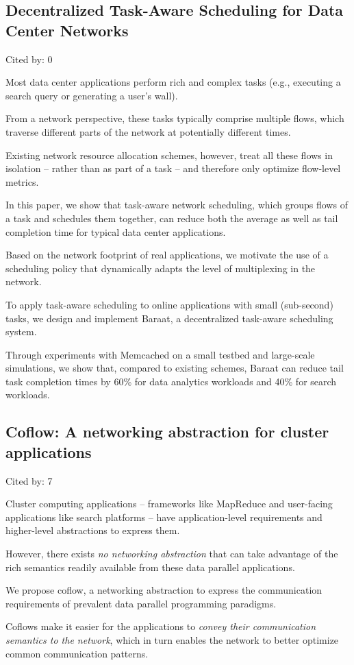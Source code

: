 \documentclass[a4paper,11pt]{article}
\begin{document}
\subsection*{Decentralized Task-Aware Scheduling for Data Center Networks}
{\color{cyan} {\color{magenta} Cited by: 0}

Most data center applications perform rich and complex tasks 
(e.g., executing a search query or generating a user's wall). 

From a network perspective, these tasks typically comprise multiple flows, which traverse different
parts of the network at potentially different times. 

Existing network resource allocation schemes, 
however, 
treat all these flows in isolation – rather than as part of a task – and therefore only optimize flow-level metrics.

In this paper, 
we show that task-aware network scheduling, which groups flows of a task and schedules them together, 
can reduce both the average as well as tail completion time for typical data center applications.

Based on the network footprint of real applications, 
we motivate the use of a scheduling policy that dynamically adapts the level of multiplexing in the network. 

To apply task-aware scheduling to online applications with small (sub-second) tasks, 
we design and implement 
{\color{black} Baraat\cite{baraat}}, 
a decentralized task-aware scheduling system. 

Through experiments with Memcached on a small testbed and large-scale simulations, 
we show that, 
compared to existing schemes, 
Baraat can reduce tail task completion times by 
60\% for data analytics workloads and 
40\% for search workloads.

}

\subsection*{Coflow: A networking abstraction for cluster applications}
{\color{cyan} {\color{magenta} Cited by: 7}

Cluster computing applications – 
frameworks like MapReduce and 
user-facing applications like search platforms –
have application-level requirements and higher-level abstractions to express them. 

However, 
there exists 
{\color{red} \em no networking abstraction}
that can take advantage of the rich semantics readily available from these data parallel applications.

We propose 
{\color{black} coflow\cite{coflow}}, 
a networking abstraction to express the communication requirements of prevalent data parallel
programming paradigms. 

Coflows make it easier for the applications to 
{\color{red} \em convey their communication semantics to the network}, 
which in turn enables the network to better optimize common communication patterns.

}
\end{document}
